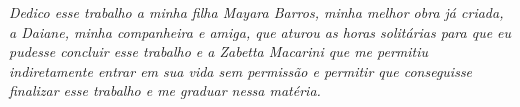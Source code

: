 \begin{dedicatoria}
   \vspace*{\fill}
   \centering
   \noindent
   \textit{Dedico esse trabalho a minha filha Mayara Barros, minha melhor obra já criada, a Daiane, minha companheira e amiga, que aturou as horas solitárias para que eu pudesse concluir esse trabalho e a Zabetta Macarini que me permitiu indiretamente entrar em sua vida sem permissão e permitir que conseguisse finalizar esse trabalho e me graduar nessa matéria.} \vspace*{\fill}
\end{dedicatoria}
